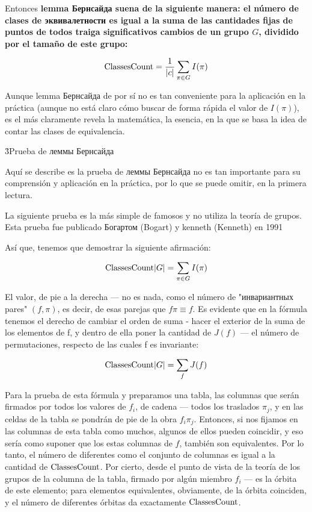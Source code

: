 Entonces \bf{lemma Бернсайда} suena de la siguiente manera: el número de clases de эквивалетности es igual a la suma de las cantidades fijas de puntos de todos traiga significativos cambios de un grupo $G$, dividido por el tamaño de este grupo:

$$ {\rm ClassesCount} = \frac{1}{|c|} \sum_{\pi \in G} I(\pi) $$

Aunque lemma Бернсайда de por sí no es tan conveniente para la aplicación en la práctica (aunque no está claro cómo buscar de forma rápida el valor de $I(\pi)$), es el más claramente revela la matemática, la esencia, en la que se basa la idea de contar las clases de equivalencia.

\h3{Prueba de леммы Бернсайда}

Aquí se describe es la prueba de леммы Бернсайда no es tan importante para su comprensión y aplicación en la práctica, por lo que se puede omitir, en la primera lectura.

La siguiente prueba es la más simple de famosos y no utiliza la teoría de grupos. Esta prueba fue publicado Богартом (Bogart) y kenneth (Kenneth) en 1991

Así que, tenemos que demostrar la siguiente afirmación:

$$ {\rm ClassesCount} |G| = \sum_{\pi \in G} I(\pi) $$

El valor, de pie a la derecha --- no es nada, como el número de "инвариантных pares" $(f, \pi)$, es decir, de esas parejas que $f \pi \equiv f$. Es evidente que en la fórmula tenemos el derecho de cambiar el orden de suma - hacer el exterior de la suma de los elementos de f, y dentro de ella poner la cantidad de $J(f)$ --- el número de permutaciones, respecto de las cuales f es invariante:

$$ {\rm ClassesCount} |G| = \sum_{f} J(f) $$

Para la prueba de esta fórmula y preparamos una tabla, las columnas que serán firmados por todos los valores de $f_i$, de cadena --- todos los traslados $\pi_j$, y en las celdas de la tabla se pondrán de pie de la obra $f_i \pi_j$. Entonces, si nos fijamos en las columnas de esta tabla como muchos, algunos de ellos pueden coincidir, y eso sería como suponer que los estas columnas de $f$, también son equivalentes. Por lo tanto, el número de diferentes como el conjunto de columnas es igual a la cantidad de $\rm ClassesCount$. Por cierto, desde el punto de vista de la teoría de los grupos de la columna de la tabla, firmado por algún miembro $f_i$ --- es la órbita de este elemento; para elementos equivalentes, obviamente, de la órbita coinciden, y el número de diferentes órbitas da exactamente $\rm ClassesCount$.

